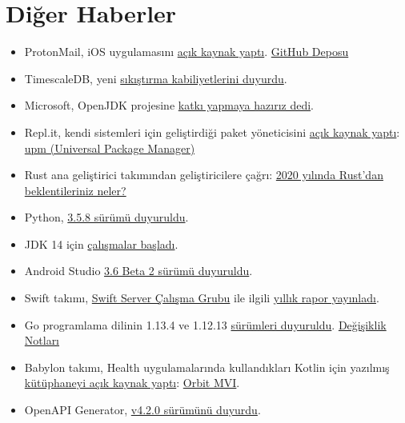 \documentclass[11pt]{article}
\begin{document}
\section{Diğer Haberler}
\label{sec:org06fa95e}
\begin{itemize}
\item ProtonMail, iOS uygulamasını \href{https://protonmail.com/blog/ios-open-source/}{açık kaynak yaptı}. \href{https://github.com/ProtonMail/ios-mail}{GitHub Deposu}
\item TimescaleDB, yeni \href{https://blog.timescale.com/blog/building-columnar-compression-in-a-row-oriented-database/}{sıkıştırma kabiliyetlerini duyurdu}.
\item Microsoft, OpenJDK projesine \href{https://mail.openjdk.java.net/pipermail/discuss/2019-October/005173.html}{katkı yapmaya hazırız dedi}.
\item Repl.it, kendi sistemleri için geliştirdiği paket yöneticisini \href{https://repl.it/site/blog/upm}{açık kaynak
yaptı}: \href{https://github.com/replit/upm}{upm (Universal Package Manager)}
\item Rust ana geliştirici takımından geliştiricilere çağrı: \href{https://blog.rust-lang.org/2019/10/29/A-call-for-blogs-2020.html}{2020 yılında Rust'dan
beklentileriniz neler?}
\item Python, \href{https://docs.python.org/3.5/whatsnew/changelog.html\#python-3-5-8}{3.5.8 sürümü duyuruldu}.
\item JDK 14 için \href{https://mail.openjdk.java.net/pipermail/jdk-dev/2019-October/003517.html}{çalışmalar başladı}.
\item Android Studio \href{https://androidstudio.googleblog.com/2019/10/android-studio-36-beta-2-available.html?m=1}{3.6 Beta 2 sürümü duyuruldu}.
\item Swift takımı, \href{https://swift.org/server/}{Swift Server Çalışma Grubu} ile ilgili \href{https://swift.org/blog/sswg-update/}{yıllık rapor yayınladı}.
\item Go programlama dilinin 1.13.4 ve 1.12.13 \href{https://groups.google.com/forum/m/\#!topic/golang-nuts/rkSaxR1oz0c}{sürümleri duyuruldu}. \href{https://golang.org/doc/devel/release.html\#go1.13.minor}{Değişiklik
Notları}
\item Babylon takımı, Health uygulamalarında kullandıkları Kotlin için yazılmış
\href{https://medium.com/babylon-engineering/introducing-orbit-mvi-for-kotlin-and-android-62491f4e3234}{kütüphaneyi açık kaynak yaptı}: \href{https://github.com/babylonhealth/orbit-mvi}{Orbit MVI}.
\item OpenAPI Generator, \href{https://github.com/OpenAPITools/openapi-generator/releases/tag/v4.2.0}{v4.2.0 sürümünü duyurdu}.

\end{itemize}
\end{document}
